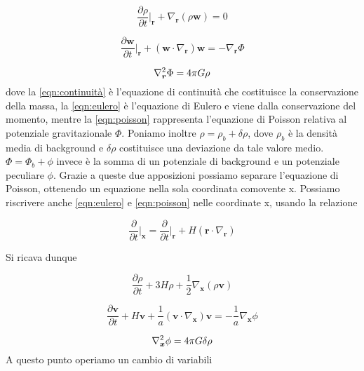 \begin{equation}
    \label{eqn:continuità}
    \frac{\partial\rho}{\partial t}\biggr|_{\bm{r}} + \nabla_{\bm{r}}(\rho \bm{w}) = 0
\end{equation}

\begin{equation}
    \label{eqn:eulero}
    \frac{\partial\bm{w}}{\partial t}\biggr|_{\bm{r}} + (\bm{w}\cdot\nabla_{\bm{r}})\bm{w} = - \nabla_{\bm{r}} \Phi
\end{equation}

\begin{equation}
    \label{eqn:poisson}
    \laplacian_{\bm{r}}\Phi = 4\pi G \rho
\end{equation}
dove la \ref{eqn:continuità} è l'equazione di continuità che costituisce la conservazione
della massa, la \ref{eqn:eulero} è l'equazione di Eulero e viene dalla conservazione del
momento, mentre la \ref{eqn:poisson} rappresenta l'equazione di Poisson relativa
al potenziale gravitazionale $\Phi$.
Poniamo inoltre $\rho = \rho_b + \delta\rho$, dove $\rho_b$ è la densità media di background
e $\delta\rho$ costituisce una deviazione da tale valore medio. $\Phi = \Phi_b + \phi$ invece
è la somma di un potenziale di background e un potenziale peculiare $\phi$. Grazie a queste due 
apposizioni possiamo separare l'equazione di Poisson, ottenendo un equazione nella sola coordinata
comovente x.
Possiamo riscrivere anche \ref{eqn:eulero} e \ref{eqn:poisson} nelle coordinate x, usando la
relazione

\begin{equation}
    \frac{\partial}{\partial t}\biggr|_{\bm{x}} = \frac{\partial}{\partial t}\biggr|_{\bm{r}} + H(\bm{r} \cdot \nabla_{\bm{r}})
\end{equation}

Si ricava dunque

\begin{equation}
    \frac{\partial\rho}{\partial t} + 3H\rho +\frac{1}{2}\nabla_{\bm{x}}(\rho\bm{v})
\end{equation}

\begin{equation}
    \frac{\partial \bm{v}}{\partial t} + H \bm{v} + \frac{1}{a}(\bm{v}\cdot\nabla_{\bm{x}})\bm{v} = -\frac{1}{a}\nabla_{\bm{x}}\phi
\end{equation}

\begin{equation}
    \label{eqn:poissonx}
    \laplacian_{\bm{x}}\phi = 4\pi G \delta\rho
\end{equation}
A questo punto operiamo un cambio di variabili


